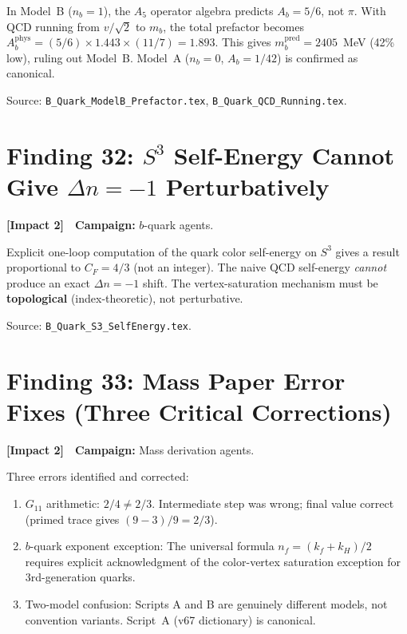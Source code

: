 \documentclass[11pt,a4paper]{article}
\newcommand{\impacttwo}{\textcolor{impact2}{\textbf{[Impact 2]}}}
\begin{document}
In Model~B ($n_b = 1$), the $A_5$ operator algebra predicts $A_b = 5/6$,
not $\pi$. With QCD running from $v/\sqrt{2}$ to $m_b$, the total prefactor
becomes $A_b^{\mathrm{phys}} = (5/6) \times 1.443 \times (11/7) = 1.893$.
This gives $m_b^{\mathrm{pred}} = 2405$~MeV (42\% low), ruling out
Model~B. Model~A ($n_b = 0$, $A_b = 1/42$) is confirmed as canonical.

Source: \texttt{B\_Quark\_ModelB\_Prefactor.tex}, \texttt{B\_Quark\_QCD\_Running.tex}.


\section{Finding 32: $S^3$ Self-Energy Cannot Give $\Delta n = -1$ Perturbatively}
\label{sec:S3-selfenergy}

\impacttwo\ \ \textbf{Campaign:} $b$-quark agents.

Explicit one-loop computation of the quark color self-energy on $S^3$
gives a result proportional to $C_F = 4/3$ (not an integer). The naive
QCD self-energy \emph{cannot} produce an exact $\Delta n = -1$ shift.
The vertex-saturation mechanism must be \textbf{topological}
(index-theoretic), not perturbative.

Source: \texttt{B\_Quark\_S3\_SelfEnergy.tex}.


\section{Finding 33: Mass Paper Error Fixes (Three Critical Corrections)}
\label{sec:error-fixes}

\impacttwo\ \ \textbf{Campaign:} Mass derivation agents.

Three errors identified and corrected:
\begin{enumerate}[nosep]
\item $G_{11}$ arithmetic: $2/4 \neq 2/3$. Intermediate step was wrong;
  final value correct (primed trace gives $(9-3)/9 = 2/3$).
\item $b$-quark exponent exception: The universal formula
  $n_f = (k_f + k_H)/2$ requires explicit acknowledgment of the
  color-vertex saturation exception for 3rd-generation quarks.
\item Two-model confusion: Scripts A and B are genuinely different models,
  not convention variants. Script~A (v67 dictionary) is canonical.
\end{enumerate}
\end{document}
